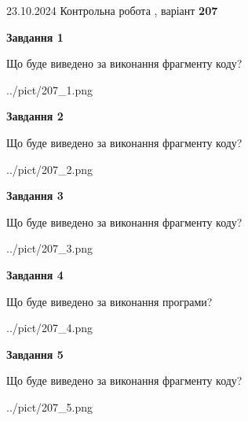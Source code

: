 \documentclass[12pt, ukrainian]{article}
\begin{document}
{\Large{23.10.2024 Контрольна робота , варіант  \No \textbf { 207 }\par}}
{
\begin {large}
{\begin {center}\textbf{Завдання 1}\end {center}}

Що буде виведено за виконання фрагменту коду?\par
\begin{center}
	{../pict/207_1.png}
\end{center}
\newpage

{\begin {center}\textbf{Завдання 2}\end {center}}

Що буде виведено за виконання фрагменту коду?\par
\begin{center}
	{../pict/207_2.png}
\end{center}
\newpage

{\begin {center}\textbf{Завдання 3}\end {center}}

Що буде виведено за виконання фрагменту коду?\par
\begin{center}
	{../pict/207_3.png}
\end{center}
\newpage

{\begin {center}\textbf{Завдання 4}\end {center}}

Що буде виведено за виконання програми?\par
\begin{center}
	{../pict/207_4.png}
\end{center}
\newpage

{\begin {center}\textbf{Завдання 5}\end {center}}

Що буде виведено за виконання фрагменту коду?\par
\begin{center}
	{../pict/207_5.png}
\end{center}
\newpage


\end{large}}
\end{document}
